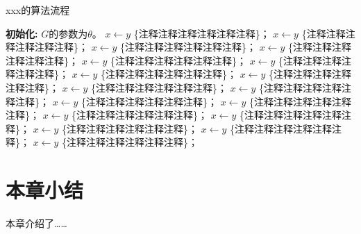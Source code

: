 \begin{algorithm}[htb]
		\caption{xxx的算法流程}\label{algo1}
		\setlength{\baselineskip}{18bp}
		\begin{algorithmic}[1]
			\State \textbf{初始化:} $G$的参数为$\theta$。
			\State $ x\gets y $ \{注释注释注释注释注释注释\}；
			\State $ x\gets y $ \{注释注释注释注释注释注释\}；
			\State $ x\gets y $ \{注释注释注释注释注释注释\}；
			\State $ x\gets y $ \{注释注释注释注释注释注释\}；
			\State $ x\gets y $ \{注释注释注释注释注释注释\}；
			\State $ x\gets y $ \{注释注释注释注释注释注释\}；
			\State $ x\gets y $ \{注释注释注释注释注释注释\}；
			\State $ x\gets y $ \{注释注释注释注释注释注释\}；
			\State $ x\gets y $ \{注释注释注释注释注释注释\}；
			\State $ x\gets y $ \{注释注释注释注释注释注释\}；
			\State $ x\gets y $ \{注释注释注释注释注释注释\}；
			\State $ x\gets y $ \{注释注释注释注释注释注释\}；
			\State $ x\gets y $ \{注释注释注释注释注释注释\}；
			\State $ x\gets y $ \{注释注释注释注释注释注释\}；
			\State $ x\gets y $ \{注释注释注释注释注释注释\}；
			\State $ x\gets y $ \{注释注释注释注释注释注释\}；
			\State $ x\gets y $ \{注释注释注释注释注释注释\}；
			\EndWhile
		\end{algorithmic}
	\end{algorithm}

\section{本章小结}
本章介绍了……
